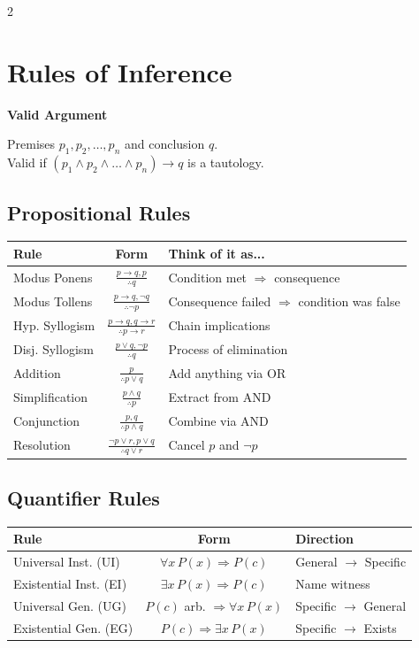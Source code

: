 \documentclass[8pt,a4paper]{article}
\newenvironment{defbox}[1][]{\vspace{2pt}\noindent\textbf{#1}\par\smallskip}{\vspace{2pt}}
\begin{document}
\begin{multicols}{2}
\section{Rules of Inference}

\begin{defbox}[Valid Argument]
Premises $p_1, p_2, \ldots, p_n$ and conclusion $q$.\\
Valid if $(p_1 \land p_2 \land \ldots \land p_n) \to q$ is a tautology.
\end{defbox}

\subsection{Propositional Rules}
\begin{center}
\scriptsize
\begin{tabular}{l|c|l}
\textbf{Rule} & \textbf{Form} & \textbf{Think of it as...} \\
\hline
Modus Ponens & $\frac{p \to q, p}{\therefore q}$ & Condition met $\Rightarrow$ consequence \\
Modus Tollens & $\frac{p \to q, \neg q}{\therefore \neg p}$ & Consequence failed $\Rightarrow$ condition was false \\
Hyp. Syllogism & $\frac{p \to q, q \to r}{\therefore p \to r}$ & Chain implications \\
Disj. Syllogism & $\frac{p \lor q, \neg p}{\therefore q}$ & Process of elimination \\
Addition & $\frac{p}{\therefore p \lor q}$ & Add anything via OR \\
Simplification & $\frac{p \land q}{\therefore p}$ & Extract from AND \\
Conjunction & $\frac{p, q}{\therefore p \land q}$ & Combine via AND \\
Resolution & $\frac{\neg p \lor r, p \lor q}{\therefore q \lor r}$ & Cancel $p$ and $\neg p$ \\
\end{tabular}
\end{center}

\subsection{Quantifier Rules}
\begin{center}
\scriptsize
\begin{tabular}{l|c|l}
\textbf{Rule} & \textbf{Form} & \textbf{Direction} \\
\hline
Universal Inst. (UI) & $\forall x\, P(x) \Rightarrow P(c)$ & General $\to$ Specific \\
Existential Inst. (EI) & $\exists x\, P(x) \Rightarrow P(c)$ & Name witness \\
Universal Gen. (UG) & $P(c)$ arb. $\Rightarrow \forall x\, P(x)$ & Specific $\to$ General \\
Existential Gen. (EG) & $P(c) \Rightarrow \exists x\, P(x)$ & Specific $\to$ Exists \\
\end{tabular}
\end{center}


\end{multicols}
\end{document}
